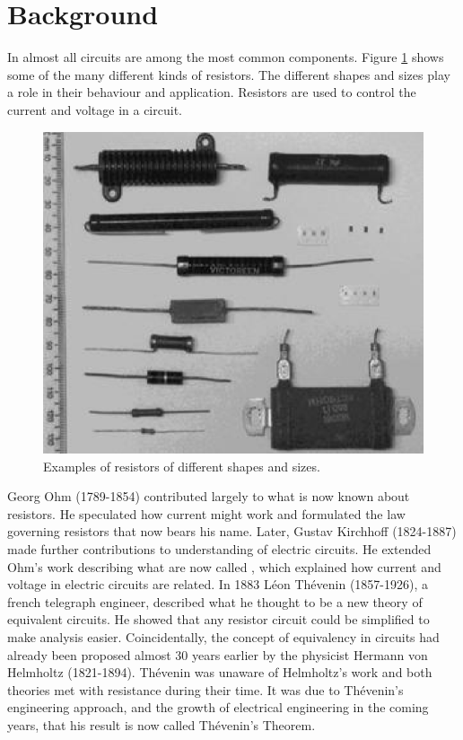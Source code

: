 \documentclass[12pt, a4paper, oneside, openright, titlepage]{book}
\begin{document}
\section{Background}

In almost all circuits  are among the most common components. Figure \ref{fig:DC2} shows some of the many different kinds of resistors. The different shapes and sizes play a role in their behaviour and application. Resistors are used to control the current and voltage in a circuit.

\begin{figure}[H]
    \centering
    \includegraphics[scale = 0.8]{Images/DC2.PNG}
    \caption{Examples of resistors of different shapes and sizes.}
    \label{fig:DC2}
\end{figure}

Georg Ohm (1789-1854) contributed largely to what is now known about resistors. He speculated how current might work and formulated the law governing resistors that now bears his name. Later, Gustav Kirchhoff (1824-1887) made further contributions to understanding of electric circuits. He extended Ohm's work describing what are now called , which explained how current and voltage in electric circuits are related. In 1883 L\'{e}on Th\'{e}venin (1857-1926), a french telegraph engineer, described what he thought to be a new theory of equivalent circuits. He showed that any resistor circuit could be simplified to make analysis easier. Coincidentally, the concept of equivalency in circuits had already been proposed almost 30 years earlier by the physicist Hermann von Helmholtz (1821-1894). Th\'{e}venin was unaware of Helmholtz's work and both theories met with resistance during their time. It was due to Th\'{e}venin's engineering approach, and the growth of electrical engineering in the coming years, that his result is now called Th\'{e}venin's Theorem.
\end{document}
